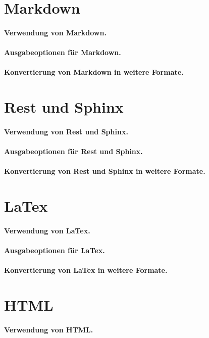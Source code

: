 \documentclass[%
oneside,                 %
final,                   %
chapterprefix=true,      %
open=right,              %
10pt]{book}
\begin{document}
\section{Markdown}
\paragraph{ Verwendung von Markdown.}
\paragraph{ Ausgabeoptionen für Markdown.}
\paragraph{ Konvertierung von Markdown in weitere Formate.}
\section{Rest und Sphinx}
\paragraph{ Verwendung von Rest und Sphinx.}
\paragraph{ Ausgabeoptionen für Rest und Sphinx.}
\paragraph{ Konvertierung von Rest und Sphinx in weitere Formate.}
\section{LaTex}
\paragraph{ Verwendung von LaTex.}
\paragraph{ Ausgabeoptionen für LaTex.}
\paragraph{ Konvertierung von LaTex in weitere Formate.}
\section{HTML}
\paragraph{ Verwendung von HTML.}
\end{document}
